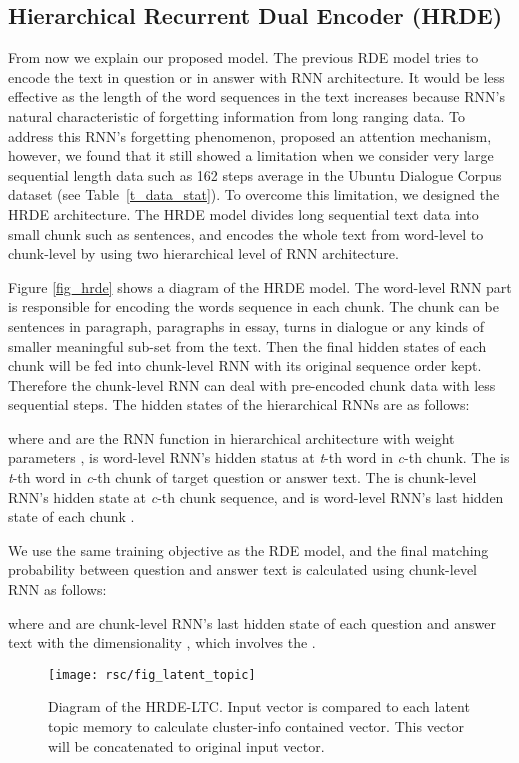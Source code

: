\documentclass[11pt,a4paper]{article}
\begin{document}
\subsection{Hierarchical Recurrent Dual Encoder (HRDE)}
From now we explain our proposed model. 
The previous RDE model tries to encode the text in question or in answer with RNN architecture. It would be less effective as the length of the word sequences in the text increases because RNN's natural characteristic of forgetting information from long ranging data. 
To address this RNN's forgetting phenomenon, \cite{bahdanau2014neural} proposed an attention mechanism, however, we found that it still showed a limitation when we consider very large sequential length data such as 162 steps average in the Ubuntu Dialogue Corpus dataset (see Table~\ref{t_data_stat}). 
To overcome this limitation, we designed the HRDE architecture. The HRDE model divides long sequential text data into small chunk such as sentences, and encodes the whole text from word-level to chunk-level by using two hierarchical level of RNN architecture. 

Figure \ref{fig_hrde} shows a diagram of the HRDE model. The word-level RNN part is responsible for encoding the words sequence 
 in each chunk.
The chunk can be sentences in paragraph, paragraphs in essay, turns in dialogue or any kinds of smaller meaningful sub-set from the text. Then the final hidden states of each chunk will be fed into chunk-level RNN with its original sequence order kept. Therefore the chunk-level RNN can deal with pre-encoded chunk data with less sequential steps. The hidden states of the hierarchical RNNs are as follows:

where  and  are the RNN function in hierarchical architecture with weight parameters ,  is word-level RNN's hidden status at \textit{t}-th word in \textit{c}-th chunk. The  is \textit{t}-th word in \textit{c}-th chunk of target question or answer text. The  is chunk-level RNN's hidden state at \textit{c}-th chunk sequence, and  is word-level RNN's last hidden state of each chunk .  


We use the same training objective as the RDE model, and the final matching probability between question and answer text is calculated using  chunk-level RNN as follows:

where  and  are chunk-level RNN's last hidden state of each question and answer text with the dimensionality , which involves the .


\begin{figure}[t]
\centering
\texttt{[image: rsc/fig\_latent\_topic]}
\caption{
Diagram of the HRDE-LTC.
Input vector is compared to each latent topic memory  to calculate cluster-info contained vector. This vector will be concatenated to original input vector.
}
\label{fig_latent_topic}
\end{figure} 
\end{document}
